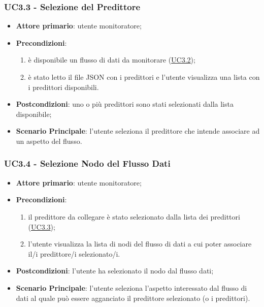 		\label{par:UC3.3}
		\subsubsection{UC3.3 - Selezione del Predittore}
		\begin{itemize}
			\item\textbf{Attore primario}: utente monitoratore;
			\item\textbf{Precondizioni}: 
				\begin{enumerate}
					\item è disponibile un flusso di dati da monitorare (\hyperref[par:UC3.2]{UC3.2}); 
					\item è stato letto il file JSON con i predittori e l'utente visualizza una lista con i predittori disponibili.
				\end{enumerate}
			\item\textbf{Postcondizioni}: uno o più predittori sono stati selezionati dalla lista disponibile;
			\item\textbf{Scenario Principale}: l’utente seleziona il predittore che intende associare ad un aspetto del flusso.
		\end{itemize}
	
	\label{par:UC3.4}
	\subsubsection{UC3.4 - Selezione Nodo del Flusso Dati}
		\begin{itemize}
			\item\textbf{Attore primario}: utente monitoratore;
			\item\textbf{Precondizioni}:
				\begin{enumerate}
					\item il predittore da collegare è stato selezionato dalla lista dei predittori (\hyperref[par:UC3.3]{UC3.3});
					\item l’utente visualizza la lista di nodi del flusso di dati a cui poter associare il/i predittore/i selezionato/i.
				\end{enumerate}
			\item\textbf{Postcondizioni}: l'utente ha selezionato il nodo dal flusso dati;
			\item\textbf{Scenario Principale}: l’utente seleziona l’aspetto interessato dal flusso di dati al quale può essere agganciato il predittore selezionato (o i predittori).
		\end{itemize}

	\label{par:UC3.5}
